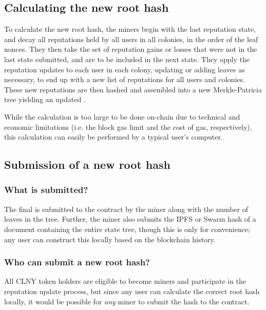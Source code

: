 \subsection{Calculating the new root hash}
To calculate the new root hash, the miners begin with the last reputation state, and decay all reputations held by all users in all colonies, in the order of the leaf nonces. They then take the set of reputation gains or losses that were not in the last state submitted, and are to be included in the next state. They apply the reputation updates to each user in each colony, updating or adding leaves as necessary, to end up with a new list of reputations for all users and colonies. These new reputations are then hashed and assembled into a new Merkle-Patricia tree yielding an updated .

While the calculation is too large to be done on-chain due to technical and economic limitations (i.e. the block gas limit and the cost of gas, respectively), this calculation can easily be performed by a typical user's computer.

\subsection{Submission of a new root hash}
%
\subsubsection*{What is submitted?}
The final  is submitted to the contract by the miner along with the number of leaves in the tree. Further, the miner also submits the IPFS or Swarm hash of a document containing the entire state tree, though this is only for convenience; any user can construct this locally based on the blockchain history.
%
\subsubsection*{Who can submit a new root hash?}
All CLNY token holders are eligible to become miners and participate in the reputation update process, but since any user can calculate the correct root hash locally, it would be possible for \emph{any} miner to submit the hash to the contract.

